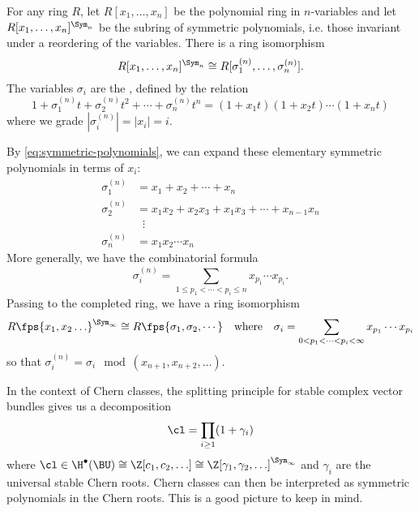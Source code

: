 \begin{theorem}
	For any ring $R$, let $R[x_1,\ldots, x_n]$ be the polynomial ring in $n$-variables and let $R[x_1,\ldots, x_n]^{\Sym_n}$ be the subring of symmetric polynomials, i.e. those invariant under a reordering of the variables. There is a ring isomorphism
	\begin{equation}\label{eq:symmetric-polynomial-isomorphism}
		R[x_1,\ldots, x_n]^{\Sym_n} \cong R[\sigma_1^{(n)},\ldots, \sigma_n^{(n)}].
	\end{equation}
	The variables $\sigma_i$ are the , defined by the relation
	\begin{equation}\label{eq:symmetric-polynomials}
		1+\sigma_1^{(n)}t+\sigma_2^{(n)}t^2+\cdots+\sigma_n^{(n)}t^n = (1+x_1t)(1+x_2t)\cdots (1+x_nt)
	\end{equation}
	where we grade $|\sigma_i^{(n)}|=|x_i|=i$.
\end{theorem}

By \cref{eq:symmetric-polynomials}, we can expand these elementary symmetric polynomials in terms of $x_i$:
\[
	\begin{aligned}
		\sigma_1^{(n)} & = x_1+x_2+\cdots + x_n                          \\
		\sigma_2^{(n)} & = x_1x_2 + x_2x_3 + x_1x_3 +\cdots + x_{n-1}x_n \\
		               & \;\;\vdots                                      \\
		\sigma_n^{(n)} & = x_1x_2\cdots x_n
	\end{aligned}
\]
More generally, we have the combinatorial formula
\[
	\sigma_i^{(n)} = \sum_{1\leq p_1<\cdots <p_i\leq n} x_{p_1}\cdots x_{p_i}.
\]
Passing to the completed ring, we have a ring isomorphism
\[
	R\fps{x_1,x_2\ldots}^{\Sym_\infty} \cong R\fps{\sigma_1,\sigma_2,\cdots}\quad\textrm{where}\quad \sigma_i = \sum_{0<p_1<\cdots < p_i<\infty}x_{p_1}\cdots x_{p_i}
\]
so that $\sigma_i^{(n)} = \sigma_i \mod (x_{n+1},x_{n+2},\ldots)$. 

\begin{remark}
In the context of Chern classes, the splitting principle for stable complex vector bundles gives us a decomposition
\[
	\cl = \prod_{i\geq 1}(1+\gamma_i)
\]
where $\cl\in \H^\bullet(\BU) \cong \Z[c_1,c_2,\ldots]\cong \Z[\gamma_1,\gamma_2,\ldots]^{\Sym_\infty}$ and $\gamma_i$ are the universal stable Chern roots. Chern classes can then be interpreted as symmetric polynomials in the Chern roots. This is a good picture to keep in mind.
\end{remark}

